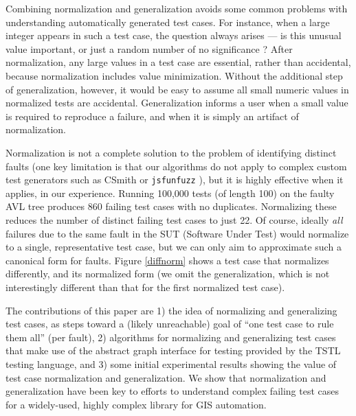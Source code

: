 Combining normalization and generalization avoids some common problems
with understanding automatically generated test cases.  For instance,
when a large integer appears in such a test case, the question always
arises --- is this unusual value important, or just a random number of
no significance \cite{MakeMost}?  After normalization, any large
values in a test case are essential, rather than
accidental, because normalization includes value minimization.
Without the additional step of generalization, however, it would be
easy to assume all small numeric values in normalized
tests are accidental.  Generalization informs a user when a small
value is required to reproduce a failure, and when it is simply an
artifact of normalization.

Normalization is not a complete solution to the problem of identifying
distinct faults (one key limitation is that our algorithms do not
apply to complex custom test generators such as CSmith \cite{csmith}
or {\tt jsfunfuzz} \cite{jsfunfuzz}), but it is highly effective when
it applies, in our experience.  Running 100,000 tests (of length 100)
on the faulty AVL tree produces 860 failing test cases with no
duplicates.  Normalizing these reduces the number of distinct failing
test cases to just 22.  Of course, ideally \emph{all} failures due to
the same fault in the SUT (Software Under Test) would normalize to a
single, representative test case, but we can only aim to approximate
such a canonical form for faults.  Figure \ref{diffnorm} shows a test
case that normalizes differently, and its normalized form (we omit the
generalization, which is not interestingly different than that for the
first normalized test case).

The contributions of this paper are 1) the idea of normalizing and
generalizing test cases, as steps toward a (likely unreachable) goal
of ``one test case to rule them all'' (per fault), 2) algorithms for normalizing
and generalizing test cases that make use of the abstract graph
interface for testing provided by the TSTL \cite{NFM15,ISSTA15}
testing language, and 3) some initial experimental results showing the
value of test case normalization and generalization.  We show that
normalization and generalization have been key to efforts to understand
complex failing test cases for a widely-used, highly complex library
for GIS automation.

